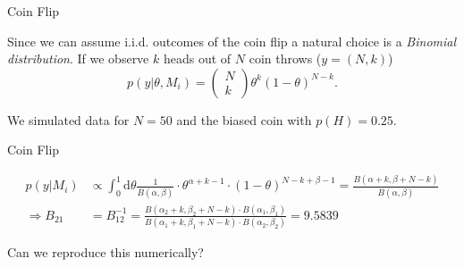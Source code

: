 \documentclass[11pt,aspectratio=1610,dvipsnames]{beamer}
\begin{document}
\begin{frame}{Coin Flip}
		\begin{tcolorbox}[colback=black!5,colframe=gray!15!black,title=Choosing a likelihood]
			Since we can assume i.i.d. outcomes of the coin flip a natural choice is a \emph{Binomial distribution}.
			If we observe $k$ heads out of $N$ coin throws ($y=(N,k)$) $$p(y|\theta,M_i)=\begin{pmatrix}N\\k
			\end{pmatrix}\theta^k(1-\theta)^{N-k}.$$
		\end{tcolorbox}
We simulated data for $N=50$ and the biased coin with $p(H)=0.25$.
\end{frame}

\begin{frame}{Coin Flip}
	\begin{tcolorbox}[colback=black!5,colframe=gray!15!black,title=Finally computing the \textsc{Bayes} factor]
		\begin{align*}
		p(y|M_i)&\propto \int_{0}^{1} \text{d}\theta \frac{1}{B(\alpha,\beta)} \cdot \theta^{\alpha+k-1}\cdot (1-\theta)^{N-k+\beta-1}
		=\frac{B(\alpha+k,\beta+N-k)}{B(\alpha, \beta)}\\
		\Rightarrow B_{21}&=B_{12}^{-1}=\frac{B(\alpha_2+k,\beta_2+N-k)\cdot B(\alpha_1,\beta_1)}{B(\alpha_1+k,\beta_1+N-k)\cdot B(\alpha_2,\beta_2)}=9.5839
		\end{align*}
	\end{tcolorbox}
Can we reproduce this numerically?
\end{frame}
\end{document}
